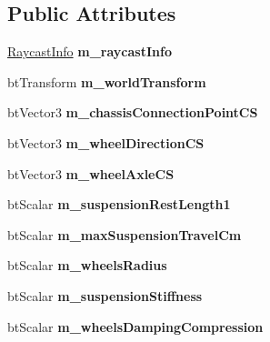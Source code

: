 \subsection*{Public Attributes}
\begin{DoxyCompactItemize}
\item 
\mbox{\label{structbtWheelInfo_ae628d995c45e7475589f655f95acd301}} 
\hyperlink{structbtWheelInfo_1_1RaycastInfo}{Raycast\+Info} {\bfseries m\+\_\+raycast\+Info}
\item 
\mbox{\label{structbtWheelInfo_acdf5fe66004c026e297d96a371ebc598}} 
bt\+Transform {\bfseries m\+\_\+world\+Transform}
\item 
\mbox{\label{structbtWheelInfo_a9f687488242322590a95687868d8a411}} 
bt\+Vector3 {\bfseries m\+\_\+chassis\+Connection\+Point\+CS}
\item 
\mbox{\label{structbtWheelInfo_a5b9feca7a6d901e0418129e565f47623}} 
bt\+Vector3 {\bfseries m\+\_\+wheel\+Direction\+CS}
\item 
\mbox{\label{structbtWheelInfo_aabf212ac6dd020d9ded6fcb647c35523}} 
bt\+Vector3 {\bfseries m\+\_\+wheel\+Axle\+CS}
\item 
\mbox{\label{structbtWheelInfo_a65aeca58e428598b01386e1794de28c9}} 
bt\+Scalar {\bfseries m\+\_\+suspension\+Rest\+Length1}
\item 
\mbox{\label{structbtWheelInfo_a81c29a33875c0db7cbe17481d030d905}} 
bt\+Scalar {\bfseries m\+\_\+max\+Suspension\+Travel\+Cm}
\item 
\mbox{\label{structbtWheelInfo_a96d9d2f181b20598bdaa58cb79e65b0f}} 
bt\+Scalar {\bfseries m\+\_\+wheels\+Radius}
\item 
\mbox{\label{structbtWheelInfo_a53b2e9061f96d3002137870fc1fdd419}} 
bt\+Scalar {\bfseries m\+\_\+suspension\+Stiffness}
\item 
\mbox{\label{structbtWheelInfo_aa95b4d18939e3dfaab0485357b75ab9e}} 
bt\+Scalar {\bfseries m\+\_\+wheels\+Damping\+Compression}

\end{DoxyCompactItemize}
